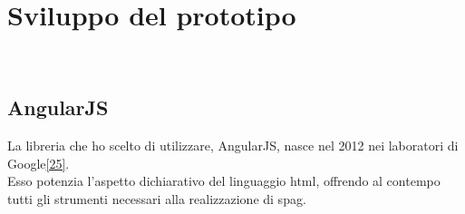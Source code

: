 
\chapter{Sviluppo del prototipo}
\label{cap:sviluppo-prototipo}

\\

\section{AngularJS}
\label{sec:AngularJS}

La libreria che ho scelto di utilizzare, AngularJS, nasce nel 2012 nei laboratori di Google\hyperlink{25}{[25]}.\\
Esso potenzia l'aspetto dichiarativo del linguaggio \gls{html}, offrendo al contempo tutti gli strumenti necessari alla realizzazione di \gls{spag}. 
